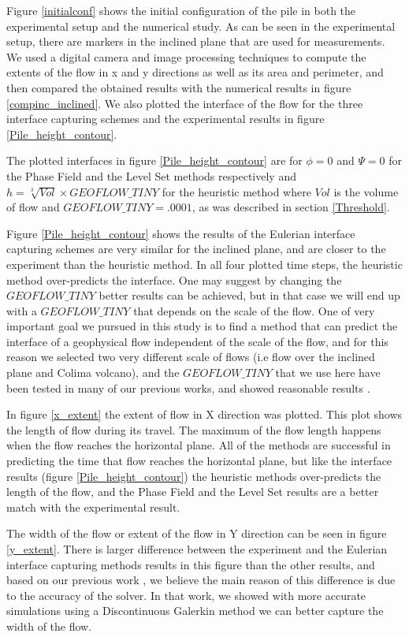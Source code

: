 \documentclass[letterpaper,10pt]{article}
\begin{document}
Figure \ref{initialconf} shows the initial configuration of the pile in both the experimental setup and the numerical study. As can be seen in the experimental setup, 
there are markers in the inclined plane that are used for measurements. We used a digital camera and image processing techniques to compute the extents of the flow in 
x and y directions as well as its area and perimeter, and then compared the obtained results with the numerical results in figure \ref{compinc_inclined}. We also plotted 
the interface of the flow for the three interface capturing schemes and the experimental results in figure \ref{Pile_height_contour}.

The plotted interfaces in figure \ref{Pile_height_contour} are for $\phi=0$ and $\varPsi=0$ for the Phase Field and the Level Set methods respectively 
and $h=\sqrt[3]{Vol} \times GEOFLOW\_TINY $ for the heuristic method where $Vol$ is the volume of flow and $GEOFLOW\_TINY= .0001$, as was described in section \ref{Threshold}.

Figure \ref{Pile_height_contour} shows the results of the Eulerian interface capturing schemes are very similar for the inclined plane, 
and are closer to the experiment than the heuristic method. In all four plotted time steps, the heuristic method over-predicts the interface. 
One may suggest by changing the $GEOFLOW\_TINY $ better results can be achieved, but in that case we will end up with a  $GEOFLOW\_TINY $ that depends on the scale of the flow. 
One of very important goal we pursued in this study is to find a method that can predict the interface of a geophysical flow independent of the scale of the flow, 
and for this reason we selected two very different scale of flows (i.e flow over the inclined plane and Colima volcano), 
and the $GEOFLOW\_TINY $ that we use here have been tested in many of our previous works, and showed reasonable results \cite{Patra2005,Patra2006}. 

In figure \ref{x_extent} the extent of flow in X direction was plotted. This plot shows the length of flow during its travel. 
The maximum of the flow length happens when the flow reaches the horizontal plane. All of the methods are successful in predicting the time 
that flow reaches the horizontal plane, but like the interface results (figure \ref{Pile_height_contour}) the heuristic methods over-predicts the length of the flow, 
and the Phase Field and the Level Set results are a better match with the experimental result.

The width of the flow or extent of the flow in Y direction can be seen in figure \ref{y_extent}. 
There is larger difference between the experiment and the Eulerian interface capturing methods results in this figure than the other results, 
and based on our previous work \cite{Patra2006}, we believe the main reason of this difference is due to the accuracy of the solver. 
In that work, we showed with more accurate simulations using a Discontinuous Galerkin method we can better capture the width of the flow.
\end{document}
